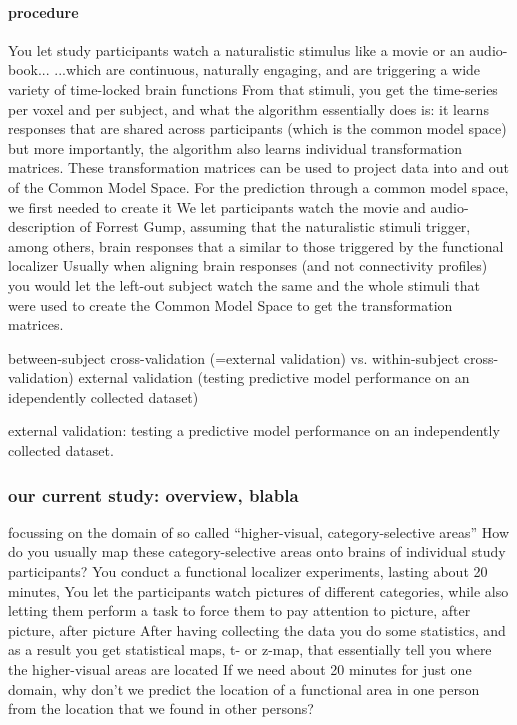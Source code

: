 \paragraph{procedure}
%
You let study participants watch a naturalistic stimulus like a movie or an
audio-book...  ...which are continuous, naturally engaging, and are triggering a
wide variety of time-locked brain functions
%
From that stimuli, you get the time-series per voxel and per subject, and what
the algorithm essentially does is: it learns responses that are shared across
participants (which is the common model space)
%
but more importantly, the algorithm also learns individual transformation
matrices.
%
These transformation matrices can be used to project data into and out of the
Common Model Space.
For the prediction through a common model space, we first needed to create it
%
We let participants watch the movie and audio-description of Forrest Gump,
assuming that the naturalistic stimuli trigger, among others, brain responses
that a similar to those triggered by the functional localizer
%
Usually when aligning brain responses (and not connectivity profiles) you would
let the left-out subject watch the same and the whole stimuli that were used to
create the Common Model Space to get the transformation matrices.

between-subject cross-validation (=external validation) vs. within-subject cross-validation)
external validation (testing predictive model performance on an idependently
collected dataset)

external validation: testing a predictive model performance on an independently
collected dataset.

\subsubsection{our current study: overview, blabla}
%
focussing on the domain of so called ``higher-visual, category-selective
areas''
%
How do you usually map these category-selective areas onto brains of individual
study participants?
%
You conduct a functional localizer experiments, lasting about 20 minutes,
%
You let the participants watch pictures of different categories, while also
letting them perform a task to force them to pay attention to picture, after
picture, after picture
%
After having collecting the data you do some statistics, and as a result you
get statistical maps, t- or z-map, that essentially tell you where the
higher-visual areas are located
%
If we need about 20 minutes for just one domain, why don’t we predict the
location of a functional area in one person from the location that we found in
other persons?


